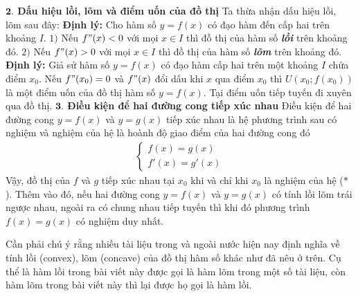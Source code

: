 \begin{multicols}{2}
	\vskip 0.1cm
	\textbf{\color{hoccungpi}$\pmb{2.}$ Dấu hiệu lồi, lõm và điểm uốn của đồ thị}
	\vskip 0.1cm
	Ta thừa nhận dấu hiệu lồi, lõm sau đây:
	\vskip 0.1cm
	\textbf{\color{hoccungpi}Định lý:} Cho hàm số $y = f(x)$ có đạo hàm đến cấp hai trên khoảng $I$.
	\vskip 0.1cm
	$1)$ Nếu $f "(x)< 0$ với mọi $x\in I$ thì đồ thị của hàm số \textbf{\color{hoccungpi}\itshape lồi} trên khoảng đó. 
	\vskip 0.1cm
	$2)$ Nếu $f "(x)> 0$ với mọi $x\in I$ thì đồ thị của hàm số  \textbf{\color{hoccungpi}\itshape lõm} trên khoảng đó.
	\vskip 0.1cm
	\textbf{\color{hoccungpi}Định lý:} Giả sử hàm số $y = f(x)$ có đạo hàm cấp hai trên một khoảng $I$ chứa điểm $ x _0$. Nếu $f"(x_0) = 0$ và $f"(x) $ đổi dấu khi $x$ qua điểm $x_0$ thì $U(x_0;f(x_0))$ là một điểm uốn của đồ thị hàm số $y = f(x)$.
	\vskip 0.1cm
	Tại điểm uốn tiếp tuyến đi xuyên qua đồ thị.
	\vskip 0.1cm
	\textbf{\color{hoccungpi}$\pmb{3.}$ Điều kiện để hai đường cong tiếp xúc nhau}
	\vskip 0.1cm
	Điều kiện để hai đường cong $y= f(x)$ và $y=g(x) $ tiếp xúc nhau là hệ phương trình sau có nghiệm và nghiệm của hệ là hoành độ giao điểm của hai đường cong đó \begin{align*}
		\begin{cases}f(x)=g(x)\\ f'(x)=g'(x)\end{cases}\tag{$*$}
	\end{align*}
	Vậy, đồ thị của $f$ và $g$ tiếp xúc nhau tại $x_0$ khi và chỉ khi $x_0$ là nghiệm của hệ ($*$).
	\vskip 0.1cm
	Thêm vào đó, nếu hai đường cong $y=f(x)$ và $y=g(x)$ có tính lồi lõm trái ngược nhau, ngoài ra có chung nhau tiếp tuyến thì khi đó phương trình $f(x)=g(x)$ có nghiệm duy nhất.
	\begin{center}
	\end{center}
	Cần phải chú ý rằng nhiều tài liệu trong và ngoài nước hiện nay định nghĩa về tính lồi (convex), lõm (concave) của đồ thị hàm số khác như đã nêu ở trên. Cụ thể là hàm lồi trong bài viết này được gọi là hàm lõm trong một số tài liệu, còn hàm lõm trong bài viết này thì lại được họ gọi là hàm lồi. 

\end{multicols}
